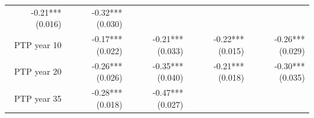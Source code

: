 \documentclass[]{article}
\begin{document}
\begin{longtable}[c]{@{}rrrrr@{}}
\begin{minipage}[t]{0.18\columnwidth}\raggedleft\strut
-0.21*** (0.016)
\strut\end{minipage} &
\begin{minipage}[t]{0.15\columnwidth}\raggedleft\strut
-0.32*** (0.030)
\strut\end{minipage}\tabularnewline
\begin{minipage}[t]{0.17\columnwidth}\raggedleft\strut
PTP year 10
\strut\end{minipage} &
\begin{minipage}[t]{0.20\columnwidth}\raggedleft\strut
-0.17*** (0.022)
\strut\end{minipage} &
\begin{minipage}[t]{0.16\columnwidth}\raggedleft\strut
-0.21*** (0.033)
\strut\end{minipage} &
\begin{minipage}[t]{0.18\columnwidth}\raggedleft\strut
-0.22*** (0.015)
\strut\end{minipage} &
\begin{minipage}[t]{0.15\columnwidth}\raggedleft\strut
-0.26*** (0.029)
\strut\end{minipage}\tabularnewline
\begin{minipage}[t]{0.17\columnwidth}\raggedleft\strut
PTP year 20
\strut\end{minipage} &
\begin{minipage}[t]{0.20\columnwidth}\raggedleft\strut
-0.26*** (0.026)
\strut\end{minipage} &
\begin{minipage}[t]{0.16\columnwidth}\raggedleft\strut
-0.35*** (0.040)
\strut\end{minipage} &
\begin{minipage}[t]{0.18\columnwidth}\raggedleft\strut
-0.21*** (0.018)
\strut\end{minipage} &
\begin{minipage}[t]{0.15\columnwidth}\raggedleft\strut
-0.30*** (0.035)
\strut\end{minipage}\tabularnewline
\begin{minipage}[t]{0.17\columnwidth}\raggedleft\strut
PTP year 35
\strut\end{minipage} &
\begin{minipage}[t]{0.20\columnwidth}\raggedleft\strut
-0.28*** (0.018)
\strut\end{minipage} &
\begin{minipage}[t]{0.16\columnwidth}\raggedleft\strut
-0.47*** (0.027)
\strut\end{minipage} &

\end{longtable}
\end{document}
